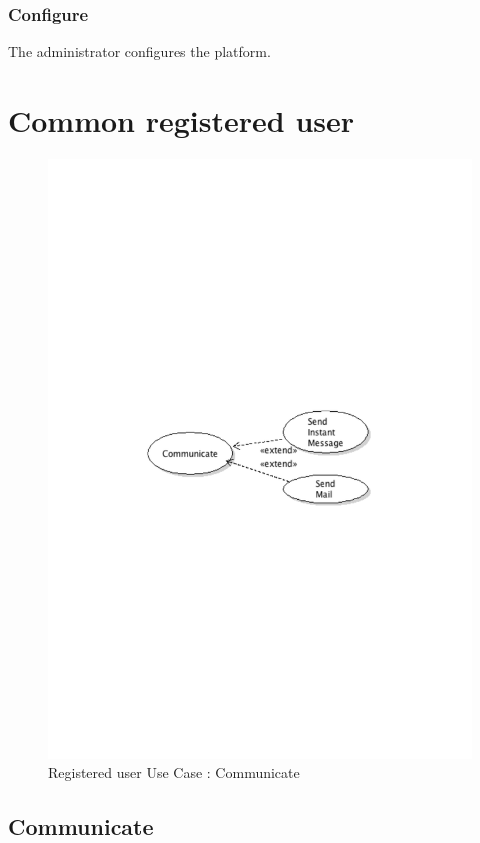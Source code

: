 		\subsubsection{Configure}
			The administrator configures the platform.
\newpage
\section{Common registered user}
	\begin{figure}[ht]
		\begin{center}
			\includegraphics[width=\textwidth,  trim=2cm 12cm 2cm 12cm]{UML_figure/UC/common/UC_Common_Communicate.pdf}
			\caption{Registered user Use Case : Communicate}
		\end{center}
	\end{figure}
	\subsection{Communicate}
